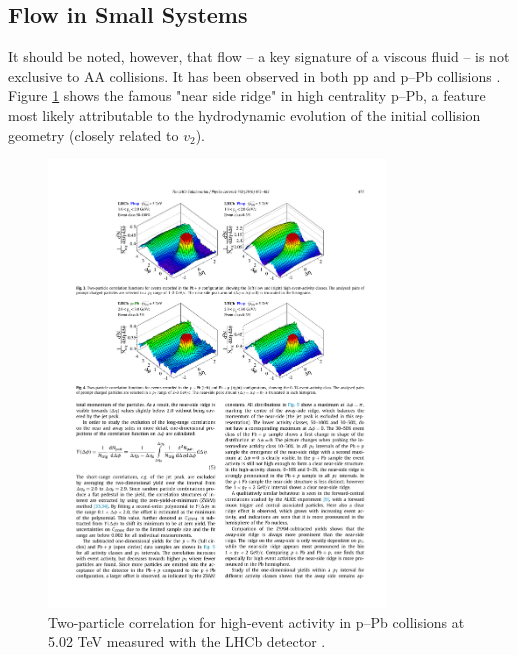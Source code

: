 


\subsection{Flow in Small Systems}
It should be noted, however, that flow -- a key signature of a viscous fluid -- is not exclusive to AA collisions. It has been observed in both pp \cite{Khachatryan2010} and p--Pb collisions \cite{Abelev2013,Aaij2016}. Figure \ref{fig:near_side_ridge} shows the famous "near side ridge" in high centrality p--Pb, a feature most likely attributable to the hydrodynamic evolution of the initial collision geometry (closely related to $v_2$).

\begin{figure}[htpb]
  \centering
  \includegraphics[width=0.8\textwidth]{Introduction/near_side_ridge.pdf}
  \caption{Two-particle correlation for high-event activity in p–Pb collisions at 5.02 TeV measured with the LHCb detector \cite{Aaij2016}.}
  \label{fig:near_side_ridge}
\end{figure}

